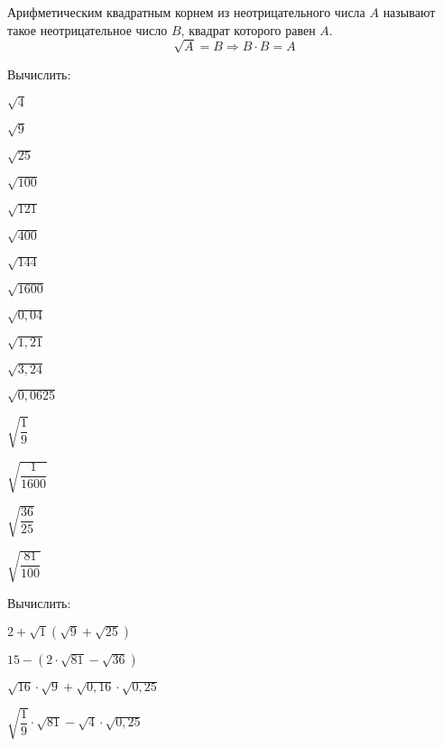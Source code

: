 %
%
%
%
\begin{class}[number=2]
	\begin{definit}
		Арифметическим квадратным корнем из неотрицательного числа \( A \) называют такое неотрицательное число \( B \), квадрат которого равен \( A \).
		\[ \sqrt{A}=B \Rightarrow B\cdot B = A \]
	\end{definit}
	\begin{listofex}
		\item Вычислить:
		\begin{enumcols}[itemcolumns=6]
			\item \( \sqrt{4} \)
			\item \( \sqrt{9} \)
			\item \( \sqrt{25} \)
			\item \( \sqrt{100} \)
			\item \( \sqrt{121} \)
			\item \( \sqrt{400} \)
			\item \( \sqrt{144} \)
			\item \( \sqrt{1600} \)
			\item \( \sqrt{0,04} \)
			\item \( \sqrt{1,21} \)
			\item \( \sqrt{3,24} \)
			\item \( \sqrt{0,0625} \)
			\item \( \sqrt{\dfrac{1}{9}} \)
			\item \( \sqrt{\dfrac{1}{1600}} \)
			\item \( \sqrt{\dfrac{36}{25}} \)
			\item \( \sqrt{\dfrac{81}{100}} \)
		\end{enumcols}
		\item Вычислить:
		\begin{enumcols}[itemcolumns=2]
			\item \( 2+\sqrt{1}(\sqrt{9}+\sqrt{25}) \)
			\item \( 15-(2\cdot\sqrt{81}-\sqrt{36}) \)
			\item \( \sqrt{16}\cdot\sqrt{9}+\sqrt{0,16}\cdot\sqrt{0,25} \)
			\item \( \sqrt{\dfrac{1}{9}}\cdot\sqrt{81}-\sqrt{4}\cdot\sqrt{0,25} \)

\end{enumcols}
\end{listofex}
\end{class}
